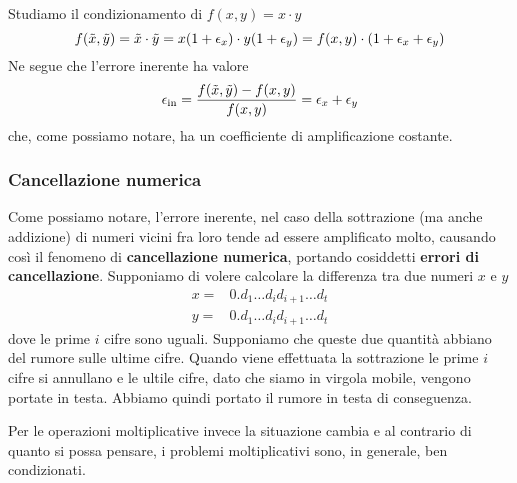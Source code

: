 \begin{example}
	Studiamo il condizionamento di $f(x, y) = x\cdot y$
	\[
		f(\tilde{x}, \tilde{y}) = \tilde{x} \cdot \tilde{y} = x (1 + \epsilon_x) \cdot y (1 + \epsilon_y) =
		f(x, y) \cdot (1 + \epsilon_x + \epsilon_y)
	\]
	Ne segue che l'errore inerente ha valore
	\[ \epsilon_\text{in} = \frac{f(\tilde{x}, \tilde{y}) - f(x, y)}{f(x, y)} = \epsilon_x + \epsilon_y \]
	che, come possiamo notare, ha un coefficiente di amplificazione costante.
\end{example}

\subsubsection{Cancellazione numerica}
Come possiamo notare, l'errore inerente, nel caso della sottrazione (ma anche addizione) di numeri vicini fra
loro tende ad essere amplificato molto, causando così il fenomeno di \textbf{cancellazione numerica}, portando
cosiddetti \textbf{errori di cancellazione}. Supponiamo di volere calcolare la differenza tra due numeri $x$
e $y$
\begin{align*}
	x = & 0. d_1 \dots d_i d_{i+1} \dots d_t \\
	y = & 0. d_1 \dots d_i d_{i+1} \dots d_t
\end{align*}
dove le prime $i$ cifre sono uguali. Supponiamo che queste due quantità abbiano del rumore sulle ultime cifre.
Quando viene effettuata la sottrazione le prime $i$ cifre si annullano e le ultile cifre, dato che siamo in
virgola mobile, vengono portate in testa. Abbiamo quindi portato il rumore in testa di conseguenza.

Per le operazioni moltiplicative invece la situazione cambia e al contrario di quanto si possa pensare, i problemi
moltiplicativi sono, in generale, ben condizionati.

